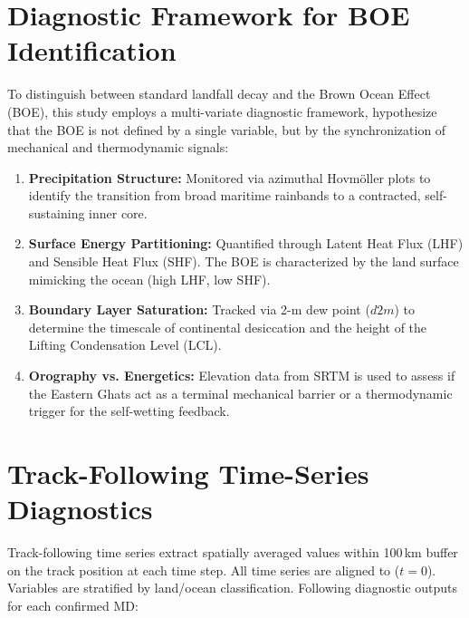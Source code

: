 \section{Diagnostic Framework for BOE Identification}
\label{sec:method_boe_framework}

To distinguish between standard landfall decay and the Brown Ocean
Effect (BOE), this study employs a multi-variate diagnostic framework,
hypothesize that the BOE is not defined by a single variable, but by
the synchronization of mechanical and thermodynamic signals:

\begin{enumerate}
  \item \textbf{Precipitation Structure:} Monitored via azimuthal
    Hovm\"{o}ller plots to identify the transition from broad
    maritime rainbands to a contracted, self-sustaining inner core.
  \item \textbf{Surface Energy Partitioning:} Quantified through
    Latent Heat Flux (LHF) and Sensible Heat Flux (SHF). The BOE is
    characterized by the land surface mimicking the ocean (high LHF, low SHF).
  \item \textbf{Boundary Layer Saturation:} Tracked via 2-m dew point
    ($d2m$) to determine the timescale of continental desiccation and
    the height of the Lifting Condensation Level (LCL).
  \item \textbf{Orography vs. Energetics:} Elevation data from SRTM
    is used to assess if the Eastern Ghats act as a terminal
    mechanical barrier or a thermodynamic trigger for the self-wetting feedback.
\end{enumerate}

\section{Track-Following Time-Series Diagnostics}
\label{sec:timeseries_method}

Track-following time series extract spatially averaged values within
100\,km buffer on the track position at each time step. All time
series are aligned to ($t = 0$). Variables are stratified by
land/ocean classification. Following diagnostic outputs for each confirmed MD:

